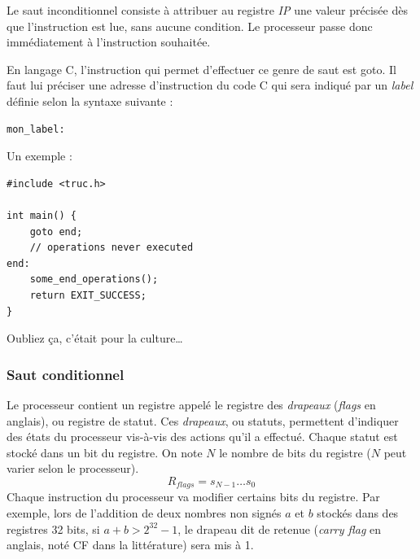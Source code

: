\documentclass[../../../main.tex]{subfiles}
\begin{document}
Le saut inconditionnel consiste à attribuer au registre \textit{IP} une valeur précisée dès que l'instruction est lue, sans aucune condition. Le processeur passe donc immédiatement à l'instruction souhaitée.
 
En langage C, l'instruction qui permet d'effectuer ce genre de saut est \textsf{goto}. Il faut lui préciser une adresse d'instruction du code C qui sera indiqué par un \textit{label} définie selon la syntaxe suivante :
\begin{verbatim}
mon_label:
\end{verbatim}
Un exemple :
\begin{verbatim}
#include <truc.h>

int main() {
	goto end;
	// operations never executed
end:
	some_end_operations();
	return EXIT_SUCCESS;
}
\end{verbatim}
Oubliez ça, c'était pour la culture\dots
 
\subsubsection{Saut conditionnel}
 
Le processeur contient un registre appelé le registre des \textit{drapeaux} (\textit{flags} en anglais), ou registre de statut. Ces \textit{drapeaux}, ou statuts, permettent d'indiquer des états du processeur vis-à-vis des actions qu'il a effectué. Chaque statut est stocké dans un bit du registre. On note $N$ le nombre de bits du registre ($N$ peut varier selon le processeur).
$$R_{flags} = s_{N-1}\dots s_{0}$$
Chaque instruction du processeur va modifier certains bits du registre. Par exemple, lors de l'addition de deux nombres non signés $a$ et $b$ stockés dans des registres 32 bits, si $a + b > 2^{32} - 1$, le drapeau dit de retenue (\textit{carry flag} en anglais, noté CF dans la littérature) sera mis à 1.
 
\end{document}
